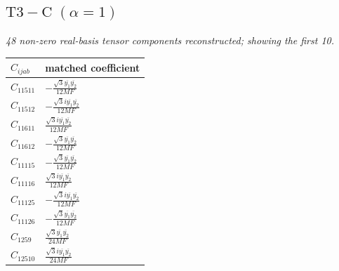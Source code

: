 \documentclass[9pt]{article}
\begin{document}
\subsection*{$ \mathrm{T3-C}\;(\alpha=1) $}
\textit{48 non-zero real-basis tensor components reconstructed; showing the first 10.}
\begin{longtable}{@{}ll@{}}
\toprule
$C_{ijab}$ & matched coefficient \\
\midrule
$C_{11511}$ & $ - \frac{\sqrt{3} \overline{y_{1}} \overline{y_{2}}}{12 MF} $ \\
$C_{11512}$ & $ - \frac{\sqrt{3} i \overline{y_{1}} \overline{y_{2}}}{12 MF} $ \\
$C_{11611}$ & $ \frac{\sqrt{3} i \overline{y_{1}} \overline{y_{2}}}{12 MF} $ \\
$C_{11612}$ & $ - \frac{\sqrt{3} \overline{y_{1}} \overline{y_{2}}}{12 MF} $ \\
$C_{11115}$ & $ - \frac{\sqrt{3} \overline{y_{1}} \overline{y_{2}}}{12 MF} $ \\
$C_{11116}$ & $ \frac{\sqrt{3} i \overline{y_{1}} \overline{y_{2}}}{12 MF} $ \\
$C_{11125}$ & $ - \frac{\sqrt{3} i \overline{y_{1}} \overline{y_{2}}}{12 MF} $ \\
$C_{11126}$ & $ - \frac{\sqrt{3} \overline{y_{1}} \overline{y_{2}}}{12 MF} $ \\
$C_{1259}$ & $ \frac{\sqrt{3} \overline{y_{1}} \overline{y_{2}}}{24 MF} $ \\
$C_{12510}$ & $ \frac{\sqrt{3} i \overline{y_{1}} \overline{y_{2}}}{24 MF} $ \\
\bottomrule
\end{longtable}
\end{document}
